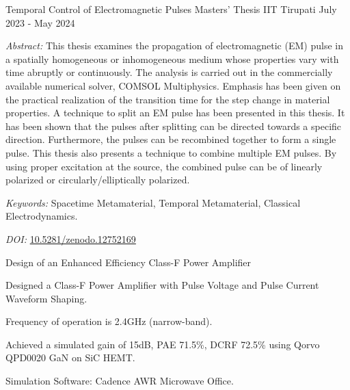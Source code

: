 


\begin{cventries}
    \cventry
      {Temporal Control of Electromagnetic Pulses} %
      {Masters' Thesis} %
      {IIT Tirupati} %
      {July 2023 - May 2024} %
      {
        \begin{cvitems} %
            \item{\textit{Abstract:} This thesis examines the propagation of electromagnetic (EM) pulse in a spatially homogeneous or inhomogeneous medium whose properties vary with time abruptly or continuously. The analysis is carried out in the commercially available numerical solver, COMSOL Multiphysics\textsuperscript{\textregistered}. Emphasis has been given on the practical realization of the transition time for the step change in material properties. A technique to split an EM pulse has been presented in this thesis. It has been shown that the pulses after splitting can be directed towards a specific direction. Furthermore, the pulses can be recombined together to form a single pulse. This thesis also presents a technique to combine multiple EM pulses. By using proper excitation at the source, the combined pulse can be of linearly polarized or circularly/elliptically polarized.}
          \item {\textit{Keywords:} Spacetime Metamaterial, Temporal Metamaterial, Classical Electrodynamics.}
          \item{\textit{DOI:} \href{https://doi.org/10.5281/zenodo.12752169}{10.5281/zenodo.12752169}}
        \end{cvitems}
      }
  

\begin{cventries}
  \cventry
    {Design of an Enhanced Efficiency Class-F Power Amplifier} %
    {} %
    {} %
    {} %
    {
      \begin{cvitems} %
        \item {Designed a Class-F Power Amplifier with Pulse Voltage and Pulse Current Waveform Shaping.}
        \item {Frequency of operation is 2.4GHz (narrow-band).}
        \item {Achieved a simulated gain of 15dB, PAE 71.5\%, DCRF 72.5\% using Qorvo QPD0020 GaN on SiC HEMT.}
        \item {Simulation Software: Cadence AWR Microwave Office.}
      \end{cvitems}
    }


\end{cventries}
\end{cventries}
